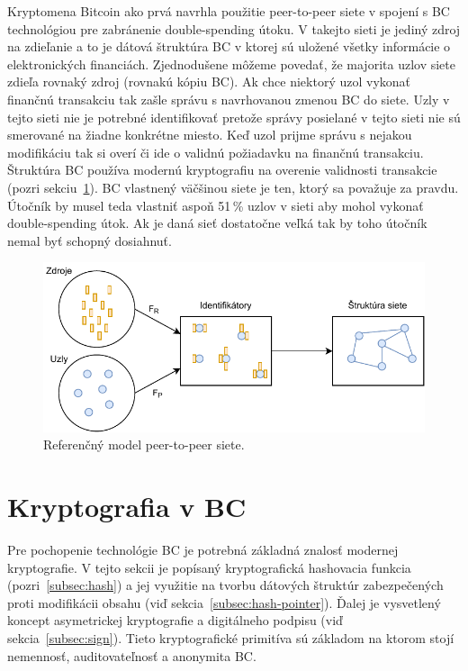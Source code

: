 Kryptomena Bitcoin ako prvá navrhla použitie peer-to-peer siete v spojení s BC technológiou pre zabránenie double-spending útoku. V takejto sieti je jediný zdroj na zdieľanie a to je dátová štruktúra BC v ktorej sú uložené všetky informácie o elektronických financiách. Zjednodušene môžeme povedať, že majorita uzlov siete zdieľa rovnaký zdroj (rovnakú kópiu BC). Ak chce niektorý uzol vykonať finančnú transakciu tak zašle správu s navrhovanou zmenou BC do siete. Uzly v tejto sieti nie je potrebné identifikovať pretože správy posielané v tejto sieti nie sú smerované na žiadne konkrétne miesto. Keď uzol prijme správu s nejakou modifikáciu tak si overí či ide o validnú požiadavku na finančnú transakciu. Štruktúra BC používa modernú kryptografiu na overenie validnosti transakcie (pozri sekciu~\ref{sec:crypto}). BC vlastnený väčšinou siete je ten, ktorý sa považuje za pravdu. Útočník by musel teda vlastniť aspoň 51\,\% uzlov v sieti aby mohol vykonať double-spending útok. Ak je daná sieť dostatočne veľká tak by toho útočník nemal byť schopný dosiahnuť.~\cite{satoshiBitcoin}

\begin{figure}[bt]
	\centering
	\includegraphics[width=\textwidth]{obrazky-figures/p2p-ref-model.pdf}
	\caption{Referenčný model peer-to-peer siete.~\cite{p2pEssence}}
	\label{img:p2p-ref-model}
\end{figure}

\section{Kryptografia v BC}\label{sec:crypto}
Pre pochopenie technológie BC je potrebná základná znalosť modernej kryptografie. V tejto sekcii je popísaný kryptografická hashovacia funkcia (pozri~\ref{subsec:hash}) a jej využitie na tvorbu dátových štruktúr zabezpečených proti modifikácii obsahu (viď sekcia~\ref{subsec:hash-pointer}). Ďalej je vysvetlený koncept asymetrickej kryptografie a digitálneho podpisu (viď sekcia~\ref{subsec:sign}). Tieto kryptografické primitíva sú základom na ktorom stojí nemennosť, auditovateľnosť a anonymita BC.

